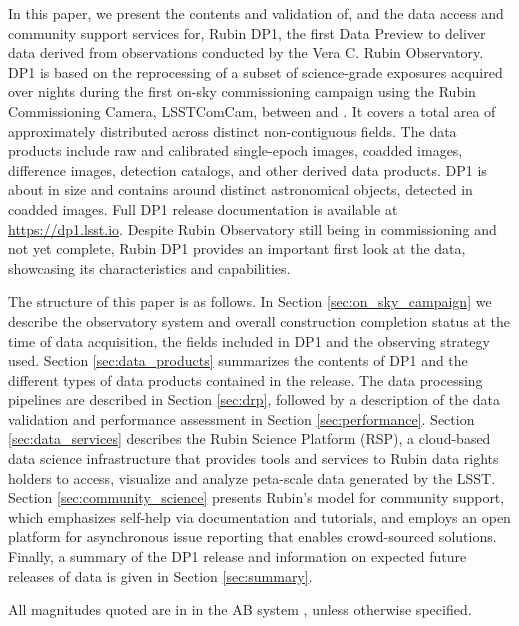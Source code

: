 In this paper, we present the contents and validation of, and the data access and community support services for, Rubin DP1, the first Data Preview to deliver data derived from observations conducted by the Vera C. Rubin Observatory. 
DP1 is based on the reprocessing of a subset of \nexposures science-grade exposures acquired over \nnightscomcam nights during the first on-sky commissioning campaign using the Rubin Commissioning Camera, LSSTComCam, between \dponestartdate and \dponeenddate. 
It covers a  total area of approximately \totalarea distributed across \nfields distinct non-contiguous fields. 
The data products include raw and calibrated single-epoch images, coadded images, difference images, detection catalogs, and other derived data products.
DP1 is about \sizeinbytes in size and contains around \nobjects distinct astronomical objects, detected in \ndeepcoadds coadded images. 
Full DP1 release documentation is available at \url{https://dp1.lsst.io}. 
Despite Rubin Observatory still being in commissioning and not yet complete, Rubin DP1 provides an important first look at the data, showcasing its characteristics and capabilities.

The structure of this paper is as follows. 
In Section \ref{sec:on_sky_campaign} we describe the observatory system and overall construction completion status at the time of data acquisition, the \nfields fields included in DP1 and the observing strategy used.  
Section \ref{sec:data_products} summarizes the contents of DP1 and the different types of data products contained in the release. 
The data processing pipelines are described in Section \ref{sec:drp}, followed by a description of the data validation and performance assessment in Section \ref{sec:performance}. 
Section \ref{sec:data_services} describes the Rubin Science Platform (RSP), a cloud-based data science infrastructure that provides tools and services to Rubin data rights holders to access, visualize and analyze peta-scale data generated by the LSST.  
Section \ref{sec:community_science} presents Rubin’s model for community support, which emphasizes self-help via documentation and tutorials, and employs an open platform for asynchronous issue reporting that enables crowd-sourced solutions.
Finally, a summary of the DP1 release and information on expected future releases of data is given in Section \ref{sec:summary}. 

All magnitudes quoted are in 
in the AB system \citep{1983ApJ...266..713O}, unless otherwise specified.

